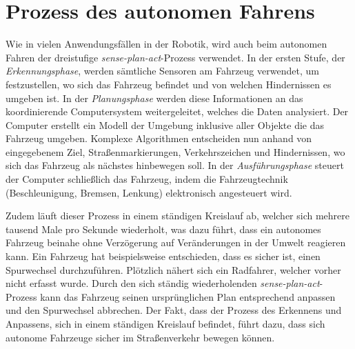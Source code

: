 \section{Prozess des autonomen Fahrens}

Wie in vielen Anwendungsfällen in der Robotik, wird auch beim autonomen Fahren der dreistufige \textit{sense-plan-act}-Prozess verwendet.  In der ersten Stufe, der \textit{Erkennungsphase}, werden sämtliche Sensoren am Fahrzeug verwendet, um festzustellen, wo sich das Fahrzeug befindet und von welchen Hindernissen es umgeben ist. In der \textit{Planungsphase} werden diese Informationen an das koordinierende Computersystem weitergeleitet, welches die Daten analysiert. Der Computer erstellt ein Modell der Umgebung inklusive aller Objekte die das Fahrzeug umgeben. Komplexe Algorithmen entscheiden nun anhand von eingegebenem Ziel, Straßenmarkierungen, Verkehrszeichen und Hindernissen, wo sich das Fahrzeug als nächstes hinbewegen soll. In der \textit{Ausführungsphase} steuert der Computer schließlich das Fahrzeug, indem die Fahrzeugtechnik (Beschleunigung, Bremsen, Lenkung) elektronisch angesteuert wird.

Zudem läuft dieser Prozess in einem ständigen Kreislauf ab, welcher sich mehrere tausend Male pro Sekunde wiederholt, was dazu führt, dass ein autonomes Fahrzeug beinahe ohne Verzögerung auf Veränderungen in der Umwelt reagieren kann. Ein Fahrzeug hat beispielsweise entschieden, dass es sicher ist, einen Spurwechsel durchzuführen. Plötzlich nähert sich ein Radfahrer, welcher vorher nicht erfasst wurde. Durch den sich ständig wiederholenden \textit{sense-plan-act}-Prozess kann das Fahrzeug seinen ursprünglichen Plan entsprechend anpassen und den Spurwechsel abbrechen. Der Fakt, dass der Prozess des Erkennens und Anpassens, sich in einem ständigen Kreislauf befindet, führt dazu, dass sich autonome Fahrzeuge sicher im Straßenverkehr bewegen können.
